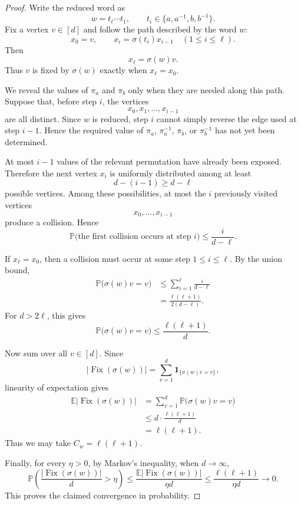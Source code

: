 \documentclass[12pt,a4paper]{amsart}
\theoremstyle{definition}
\newcommand{\Fix}{\operatorname{Fix}}
\begin{document}
	\begin{proof}
Write the reduced word as
\[
w=t_\ell\cdots t_1,
\qquad
 t_i\in\{a,a^{-1},b,b^{-1}\}.
\]
Fix a vertex $v\in[d]$ and follow the path described by the word $w$:
\[
x_0=v,
\qquad
x_i=\sigma(t_i)x_{i-1}
\quad(1\leq i\leq\ell).
\]
Then
\[
x_\ell=\sigma(w)v.
\]
Thus $v$ is fixed by $\sigma(w)$ exactly when $x_\ell=x_0$.

We reveal the values of $\pi_a$ and $\pi_b$ only when they are needed along
this path. Suppose that, before step $i$, the vertices
\[
x_0,x_1,\ldots,x_{i-1}
\]
are all distinct. Since $w$ is reduced, step $i$ cannot simply reverse the
edge used at step $i-1$. Hence the required value of $\pi_a$, $\pi_a^{-1}$,
$\pi_b$, or $\pi_b^{-1}$ has not yet been determined.

At most $i-1$ values of the relevant permutation have already been exposed.
Therefore the next vertex $x_i$ is uniformly distributed among at least
\[
d-(i-1)\geq d-\ell
\]
possible vertices. Among these possibilities, at most the $i$ previously
visited vertices
\[
x_0,\ldots,x_{i-1}
\]
produce a collision. Hence
\[
\mathbb P\bigl(\text{the first collision occurs at step }i\bigr)
\leq \frac{i}{d-\ell}.
\]

If $x_\ell=x_0$, then a collision must occur at some step
$1\leq i\leq\ell$. By the union bound,
\[
\begin{aligned}
\mathbb P\bigl(\sigma(w)v=v\bigr)
&\leq
\sum_{i=1}^{\ell}\frac{i}{d-\ell}\\
&=
\frac{\ell(\ell+1)}{2(d-\ell)}.
\end{aligned}
\]
For $d>2\ell$, this gives
\[
\mathbb P\bigl(\sigma(w)v=v\bigr)
\leq \frac{\ell(\ell+1)}{d}.
\]

Now sum over all $v\in[d]$. Since
\[
|\Fix(\sigma(w))|
=
\sum_{v=1}^{d}\mathbf 1_{\{\sigma(w)v=v\}},
\]
linearity of expectation gives
\[
\begin{aligned}
\mathbb E|\Fix(\sigma(w))|
&=
\sum_{v=1}^{d}\mathbb P\bigl(\sigma(w)v=v\bigr)\\
&\leq
 d\cdot\frac{\ell(\ell+1)}{d}\\
&=
\ell(\ell+1).
\end{aligned}
\]
Thus we may take $C_w=\ell(\ell+1)$.

Finally, for every $\eta>0$, by Markov's inequality, when $d \longrightarrow \infty$, 
\[
\mathbb P\left(
\frac{|\Fix(\sigma(w))|}{d}>\eta
\right)
\leq
\frac{\mathbb E|\Fix(\sigma(w))|}{\eta d}
\leq
\frac{\ell(\ell+1)}{\eta d}
\longrightarrow0.
\]
This proves the claimed convergence in probability.
\end{proof}
	
\end{document}
